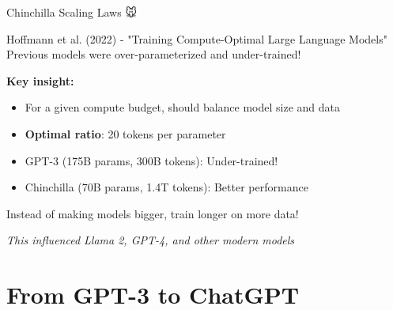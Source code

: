 \documentclass[aspectratio=169]{beamer}
\begin{document}
\begin{frame}{Chinchilla Scaling Laws 🐭}
    \begin{block}{Hoffmann et al. (2022) - "Training Compute-Optimal Large Language Models"}
        Previous models were over-parameterized and under-trained!
    \end{block}

    \vspace{0.3cm}

    \textbf{Key insight:}
    \begin{itemize}\setlength{\itemsep}{0pt}
        \item For a given compute budget, should balance model size and data
        \item \textbf{Optimal ratio}: 20 tokens per parameter
        \item GPT-3 (175B params, 300B tokens): Under-trained!
        \item Chinchilla (70B params, 1.4T tokens): Better performance
    \end{itemize}

    \vspace{0.3cm}

    \begin{thinkaboutit}
        Instead of making models bigger, train longer on more data!
    \end{thinkaboutit}

    \vspace{0.3cm}

    \small
    \textit{This influenced Llama 2, GPT-4, and other modern models}
\end{frame}

\section{From GPT-3 to ChatGPT}
\end{document}
